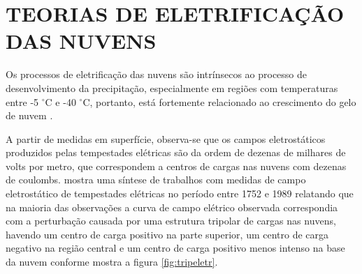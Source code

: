 








\section{TEORIAS DE ELETRIFICAÇÃO DAS NUVENS}

Os processos de eletrificação das nuvens são intrínsecos ao processo de desenvolvimento da precipitação, especialmente em regiões com temperaturas entre -5 $^{\circ}$C e -40 $^{\circ}$C, portanto, está fortemente relacionado ao crescimento do gelo de nuvem \cite{mason1953}. 

A partir de medidas em superfície, observa-se que os campos eletrostáticos produzidos pelas tempestades elétricas são da ordem de dezenas de milhares de volts por metro, que correspondem a centros de cargas nas nuvens com dezenas de coulombs. 
 mostra uma síntese de trabalhos com medidas de campo eletrostático de tempestades elétricas no período entre 1752 e 1989 relatando que na maioria das observações a curva de campo elétrico observada correspondia com a perturbação causada por uma estrutura tripolar de cargas nas nuvens, havendo um centro de carga positivo na parte superior, um centro de carga negativo na região central e um centro de carga positivo menos intenso na base da nuvem conforme mostra a figura \ref{fig:tripeletr}.


